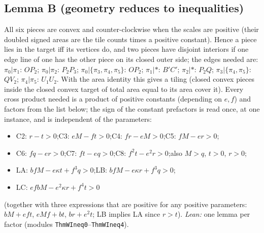 \documentclass[11pt,reqno]{amsart}
\theoremstyle{plain}
\theoremstyle{definition}
\begin{document}
\subsection{Lemma B (geometry reduces to inequalities)}
All six pieces are convex and counter-clockwise when the scales are positive (their doubled signed areas are the tile counts times a positive constant). Hence a piece lies in the target iff its vertices do, and two pieces have disjoint interiors if one edge line of one has the other piece on its closed outer side; the edges needed are: $\pi_0|\pi_1$: $OP_2$; $\pi_0|\pi_2$: $P_2P_3$; $\pi_0|\{\pi_3,\pi_4,\pi_5\}$: $OP_2$; $\pi_1|*$: $B'C'$; $\pi_2|*$: $P_2Q$; $\pi_3|\{\pi_4,\pi_5\}$: $QV_2$; $\pi_4|\pi_5$: $U_1U_2$.
With the area identity this gives a tiling (closed convex pieces inside the closed convex target of total area equal to its area cover it).
Every cross product needed is a product of positive constants (depending on $e,f$) and factors from the list below; the sign of the constant prefactors is read once, at one instance, and is independent of the parameters:
\begin{itemize}\itemsep0pt
\item C2: $r-t>0$;\quad C3: $eM-ft>0$;\quad C4: $fr-eM>0$;\quad C5: $fM-er>0$;
\item C6: $fq-er>0$;\quad C7: $ft-eq>0$;\quad C8: $f^2t-e^2r>0$;\quad also $M>q$, $t>0$, $r>0$;
\item LA: $bfM-e\kappa t+f^3q>0$;\quad LB: $bfM-e\kappa r+f^3q>0$;
\item LC: $efbM-e^2\kappa r+f^4t>0$
\end{itemize}
(together with three expressions that are positive for any positive parameters: $bM+eft$, $eMf+bt$, $br+e^2t$; LB implies LA since $r>t$).
\emph{Lean:} one lemma per factor (modules \texttt{ThmWIneq0}--\texttt{ThmWIneq4}).
\end{document}
